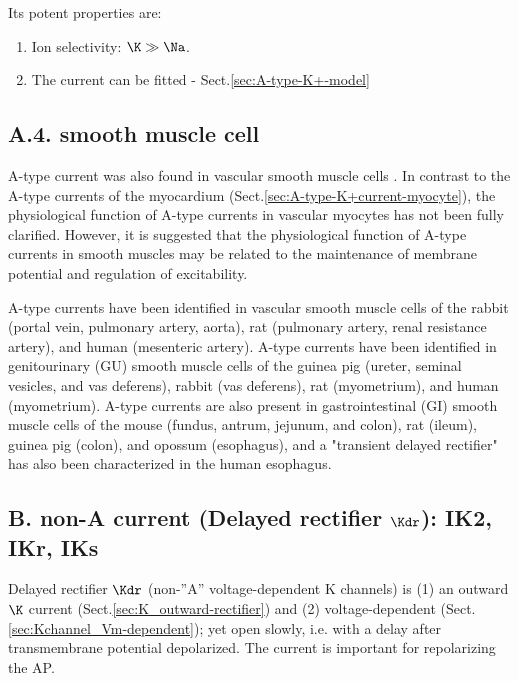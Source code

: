 Its potent properties are:
\begin{enumerate}
  \item  Ion selectivity:
$\K \gg \Na$. 

  \item The current can be fitted - Sect.\ref{sec:A-type-K+-model}
  
\end{enumerate}


\subsection{A.4. smooth muscle cell}
\label{sec:A-type-K+current-smoothmuscle}

A-type current was also found in vascular smooth muscle cells
\citep{amberg2003}. In contrast to the A-type currents of the myocardium
(Sect.\ref{sec:A-type-K+current-myocyte}), the physiological function of A-type
currents in vascular myocytes has not been fully clarified.
However, it is suggested that the physiological function of A-type currents in
smooth muscles may be related to the maintenance of membrane potential and
regulation of excitability.


A-type currents have been identified in vascular smooth
muscle cells of the rabbit (portal vein, pulmonary artery, aorta), rat
(pulmonary artery, renal resistance artery), and human (mesenteric artery).
A-type currents have been identified in genitourinary (GU) smooth muscle cells
of the guinea pig (ureter, seminal vesicles, and vas deferens), rabbit (vas
deferens), rat (myometrium), and human (myometrium).
A-type currents are also present in gastrointestinal (GI) smooth muscle cells of
the mouse (fundus, antrum, jejunum, and colon), rat (ileum), guinea pig (colon),
and opossum (esophagus), and a "transient delayed rectifier" has also been
characterized in the human esophagus.





\subsection{B. non-A current (Delayed rectifier $\Kdr$): IK2, IKr, IKs}
\label{sec:delayed-rectifier}


Delayed rectifier $\Kdr$ (non-''A'' voltage-dependent K channels) is (1) an
outward $\K$ current (Sect.\ref{sec:K_outward-rectifier}) and (2)
voltage-dependent (Sect.\ref{sec:Kchannel_Vm-dependent}); yet open slowly, i.e.
with a delay after transmembrane potential depolarized.
The current is important for repolarizing the AP.

